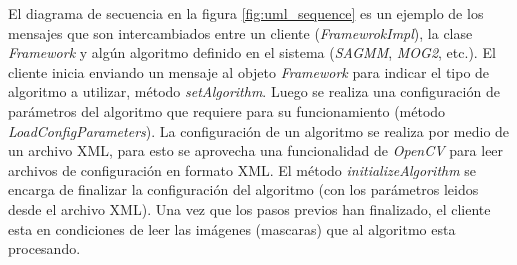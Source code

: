 



El diagrama de secuencia en la figura \ref{fig:uml_sequence} es un ejemplo de los mensajes que son intercambiados entre un cliente (\textit{FramewrokImpl}), la clase \textit{Framework} y algún algoritmo definido en el sistema (\textit{SAGMM}, \textit{MOG2}, etc.). El cliente inicia enviando un mensaje al objeto \textit{Framework} para indicar el tipo de algoritmo a utilizar, método \textit{setAlgorithm}. Luego se realiza una configuración de parámetros del algoritmo que requiere para su funcionamiento (método \textit{LoadConfigParameters}). La configuración de un algoritmo se realiza por medio de un archivo XML, para esto se aprovecha una funcionalidad de \textit{OpenCV} para leer archivos de configuración en formato XML. El método \textit{initializeAlgorithm} se encarga de finalizar la configuración del algoritmo (con los parámetros leidos desde el archivo XML). Una vez que los pasos previos han finalizado, el cliente esta en condiciones de leer las imágenes (mascaras) que al algoritmo esta procesando.



